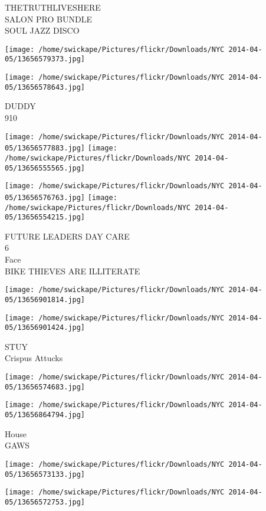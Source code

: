 \documentclass[10pt,letterpaper]{article}
\begin{document}
THETRUTHLIVESHERE\\
SALON PRO BUNDLE\\
SOUL JAZZ DISCO
\pagebreak

\texttt{[image: /home/swickape/Pictures/flickr/Downloads/NYC 2014-04-05/13656579373.jpg]}

\vspace{0.25in}
\texttt{[image: /home/swickape/Pictures/flickr/Downloads/NYC 2014-04-05/13656578643.jpg]}

DUDDY\\
910
\pagebreak

\texttt{[image: /home/swickape/Pictures/flickr/Downloads/NYC 2014-04-05/13656577883.jpg]}
\texttt{[image: /home/swickape/Pictures/flickr/Downloads/NYC 2014-04-05/13656555565.jpg]}

\texttt{[image: /home/swickape/Pictures/flickr/Downloads/NYC 2014-04-05/13656576763.jpg]}
\texttt{[image: /home/swickape/Pictures/flickr/Downloads/NYC 2014-04-05/13656554215.jpg]}

FUTURE LEADERS DAY CARE\\
6\\
Face\\
BIKE THIEVES ARE ILLITERATE
\pagebreak

\texttt{[image: /home/swickape/Pictures/flickr/Downloads/NYC 2014-04-05/13656901814.jpg]}

\vspace{0.25in}
\texttt{[image: /home/swickape/Pictures/flickr/Downloads/NYC 2014-04-05/13656901424.jpg]}

STUY\\
Crispus Attucks
\pagebreak

\texttt{[image: /home/swickape/Pictures/flickr/Downloads/NYC 2014-04-05/13656574683.jpg]}

\vspace{0.25in}
\texttt{[image: /home/swickape/Pictures/flickr/Downloads/NYC 2014-04-05/13656864794.jpg]}

House\\
GAWS
\pagebreak

\texttt{[image: /home/swickape/Pictures/flickr/Downloads/NYC 2014-04-05/13656573133.jpg]}

\vspace{0.25in}
\texttt{[image: /home/swickape/Pictures/flickr/Downloads/NYC 2014-04-05/13656572753.jpg]}
\end{document}
